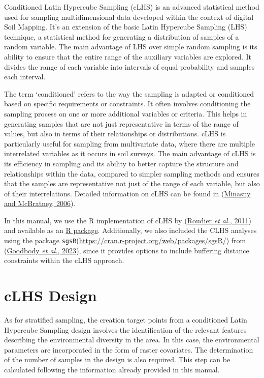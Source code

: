 \documentclass[
  10pt,
  b5paper,
  oneside]{book}
\begin{document}
Conditioned Latin Hypercube Sampling (cLHS) is an advanced statistical method used for sampling multidimensional data developed within the context of digital Soil Mapping. It's an extension of the basic Latin Hypercube Sampling (LHS) technique, a statistical method for generating a distribution of samples of a random variable. The main advantage of LHS over simple random sampling is its ability to ensure that the entire range of the auxiliary variables are explored. It divides the range of each variable into intervals of equal probability and samples each interval.

The term `conditioned' refers to the way the sampling is adapted or conditioned based on specific requirements or constraints. It often involves conditioning the sampling process on one or more additional variables or criteria. This helps in generating samples that are not just representative in terms of the range of values, but also in terms of their relationships or distributions. cLHS is particularly useful for sampling from multivariate data, where there are multiple interrelated variables as it occurs in soil surveys. The main advantage of cLHS is its efficiency in sampling and its ability to better capture the structure and relationships within the data, compared to simpler sampling methods and ensures that the samples are representative not just of the range of each variable, but also of their interrelations. Detailed information on cLHS can be found in (\protect\hyperlink{ref-minasny2006}{Minasny and McBratney, 2006}).

In this manual, we use the R implementation of cLHS by (\protect\hyperlink{ref-Roudier2011}{Roudier \emph{et al.}, 2011}) and available as an \href{https://cran.r-project.org/web/packages/clhs/}{R package}. Additionally, we also included the CLHS analyses using the package \texttt{\textquotesingle{}sgsR\textquotesingle{}}(\url{https://cran.r-project.org/web/packages/sgsR/}) from (\protect\hyperlink{ref-sgsR}{Goodbody \emph{et al.}, 2023}), since it provides options to include buffering distance constraints within the cLHS approach.

\hypertarget{clhs-design}{%
\section{cLHS Design}\label{clhs-design}}

As for stratified sampling, the creation target points from a conditioned Latin Hypercube Sampling design involves the identification of the relevant features describing the environmental diversity in the area. In this case, the environmental parameters are incorporated in the form of raster covariates. The determination of the number of samples in the design is also required. This step can be calculated following the information already provided in this manual.
\end{document}
